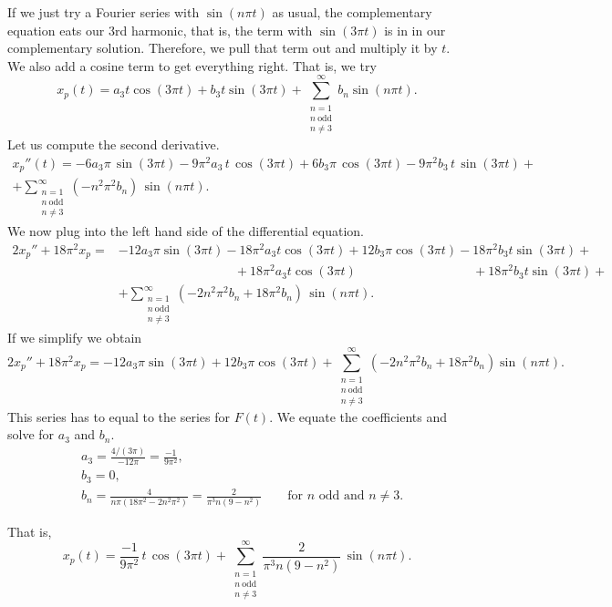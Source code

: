 \begin{example}
If we just try a Fourier series with $\sin (n\pi t)$ as usual,
the complementary equation eats our 3rd harmonic, that is, the term
with $\sin(3 \pi t)$
is in
in our complementary solution.
Therefore, we pull that term out and
multiply it by $t$.  We also add a cosine term to get everything right.
That is, we try
\begin{equation*}
x_p(t) =
a_3
t \cos (3 \pi t )
+
b_3
t \sin (3 \pi t)
+
\sum_{\substack{n=1 \\ n~\text{odd} \\ n\not= 3}}^\infty
b_n
\sin (n \pi t) . 
\end{equation*}
Let us compute the second derivative.
\begin{multline*}
x_p''(t) =
- 6 a_3
\pi \, \sin (3 \pi t) - 9\pi^2 a_3 \, t \, \cos (3 \pi t)
+
6 b_3
\pi \, \cos (3 \pi t) - 9\pi^2 b_3 \, t \, \sin (3 \pi t)
+
\\
+
\sum_{\substack{n=1 \\ n~\text{odd} \\ n\not= 3}}^\infty
(-n^2 \pi^2 b_n ) \,
\sin (n \pi t) . 
\end{multline*}
We now plug into the left hand side of the differential equation.
\begin{align*}
2x_p'' + 18\pi^2 x_p = & 
- 12 a_3 \pi \sin (3 \pi t)
- 18\pi^2 a_3 t \cos (3 \pi t)
+ 12 b_3 \pi \cos (3 \pi t)
- 18\pi^2 b_3 t \sin (3 \pi t)
+
\\
& \phantom{\, - 12 a_3 \pi \sin (3 \pi t)} ~
+ 18 \pi^2 a_3 t \cos (3 \pi t)
\phantom{\, + 12 b_3 \pi \cos (3 \pi t)} ~
+ 18 \pi^2 b_3 t \sin (3 \pi t)
+
\\
& + \sum_{\substack{n=1 \\ n~\text{odd} \\ n\not= 3}}^\infty
(-2n^2 \pi^2 b_n + 18\pi^2 b_n) \,
\sin (n \pi t) . 
\end{align*}
If we simplify we obtain
\begin{equation*}
2x_p'' + 18\pi^2 x_p =
- 12 a_3
\pi \sin (3 \pi t)
+
12 b_3
\pi \cos (3 \pi t)
+
\sum_{\substack{n=1 \\ n~\text{odd} \\ n\not= 3}}^\infty
(-2n^2 \pi^2 b_n + 18\pi^2 b_n)
\sin (n \pi t) . 
\end{equation*}
This series has to equal to the series for $F(t)$.
We equate the coefficients and solve for $a_3$ and $b_n$.
\begin{align*}
& a_3 = \frac{4/(3\pi)}{-12\pi} = \frac{-1}{9\pi^2} , \\
& b_3 = 0 , \\
& b_n = \frac{4}{n\pi(18\pi^2 - 2n^2 \pi^2)} 
= \frac{2}{\pi^3 n(9 - n^2)} \qquad \text{for } n \text{ odd and } n\not=3 .
\end{align*}

That is,
\begin{equation*}
x_p(t) =
\frac{-1}{9\pi^2}
\,
t \, \cos (3 \pi t)
+
\sum_{\substack{n=1 \\ n~\text{odd} \\ n\not= 3}}^\infty
\frac{2}{\pi^3 n(9 - n^2)} \,
\sin (n \pi t) . 
\end{equation*}
\end{example}


